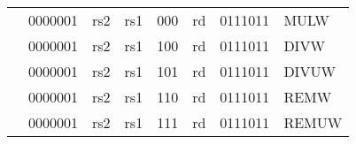 \begin{table}[p]
\begin{small}
\begin{center}
\begin{tabular}{p{0in}p{0.4in}p{0.05in}p{0.05in}p{0.05in}p{0.05in}p{0.4in}p{0.6in}p{0.4in}p{0.6in}p{0.7in}l}
&
\multicolumn{4}{|c|}{0000001} &
\multicolumn{2}{c|}{rs2} &
\multicolumn{1}{c|}{rs1} &
\multicolumn{1}{c|}{000} &
\multicolumn{1}{c|}{rd} &
\multicolumn{1}{c|}{0111011} & MULW \\
\cline{2-11}
  

&
\multicolumn{4}{|c|}{0000001} &
\multicolumn{2}{c|}{rs2} &
\multicolumn{1}{c|}{rs1} &
\multicolumn{1}{c|}{100} &
\multicolumn{1}{c|}{rd} &
\multicolumn{1}{c|}{0111011} & DIVW \\
\cline{2-11}
  

&
\multicolumn{4}{|c|}{0000001} &
\multicolumn{2}{c|}{rs2} &
\multicolumn{1}{c|}{rs1} &
\multicolumn{1}{c|}{101} &
\multicolumn{1}{c|}{rd} &
\multicolumn{1}{c|}{0111011} & DIVUW \\
\cline{2-11}
  

&
\multicolumn{4}{|c|}{0000001} &
\multicolumn{2}{c|}{rs2} &
\multicolumn{1}{c|}{rs1} &
\multicolumn{1}{c|}{110} &
\multicolumn{1}{c|}{rd} &
\multicolumn{1}{c|}{0111011} & REMW \\
\cline{2-11}
  

&
\multicolumn{4}{|c|}{0000001} &
\multicolumn{2}{c|}{rs2} &
\multicolumn{1}{c|}{rs1} &
\multicolumn{1}{c|}{111} &
\multicolumn{1}{c|}{rd} &
\multicolumn{1}{c|}{0111011} & REMUW \\
\cline{2-11}
  

\end{tabular}
\end{center}
\end{small}

\end{table}
  

\newpage

